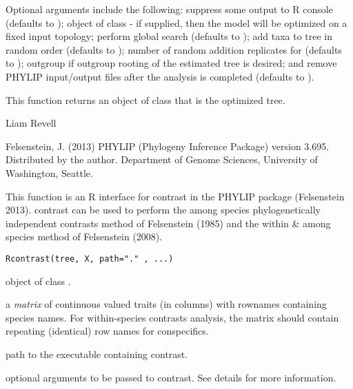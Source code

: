 \documentclass[a4paper]{book}
\begin{document}
%
\begin{Details}\relax
Optional arguments include the following:  suppress some output to R console (defaults to );  object of class  - if supplied, then the model will be optimized on a fixed input topology;  perform global search (defaults to );  add taxa to tree in random order (defaults to );  number of random addition replicates for  (defaults to );  outgroup if outgroup rooting of the estimated tree is desired; and  remove PHYLIP input/output files after the analysis is completed (defaults to ).
\end{Details}
%
\begin{Value}
This function returns an object of class  that is the optimized tree.
\end{Value}
%
\begin{Author}\relax
Liam Revell 
\end{Author}
%
\begin{References}\relax
Felsenstein, J. (2013) PHYLIP (Phylogeny Inference Package) version 3.695. Distributed by the author. Department of Genome Sciences, University of Washington, Seattle.
\end{References}
%
\begin{SeeAlso}\relax
{}
\end{SeeAlso}
%
\begin{Description}\relax
This function is an R interface for contrast in the PHYLIP package (Felsenstein 2013). contrast can be used to perform the among species phylogenetically independent contrasts method of Felsenstein (1985) and the within \& among species method of Felsenstein (2008).
\end{Description}
%
\begin{Usage}
\begin{verbatim}
Rcontrast(tree, X, path="." , ...)
\end{verbatim}
\end{Usage}
%
\begin{Arguments}
\begin{ldescription}
\item[\code{tree}] object of class .
\item[\code{X}] a \emph{matrix} of continuous valued traits (in columns) with rownames containing species names. For within-species contrasts analysis, the matrix should contain repeating (identical) row names for conspecifics.
\item[\code{path}] path to the executable containing contrast.
\item[\code{...}] optional arguments to be passed to contrast. See details for more information.
\end{ldescription}
\end{Arguments}
\end{document}
